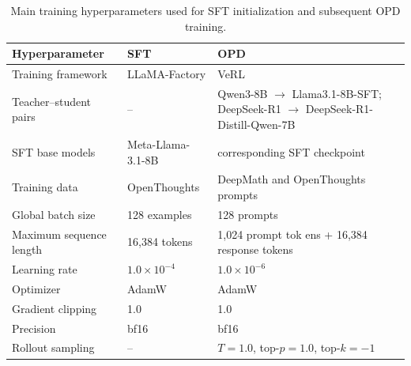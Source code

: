 \documentclass{article}
\theoremstyle{plain}
\theoremstyle{definition}
\theoremstyle{remark}
\begin{document}
        \begin{table}[htbp]
        \centering
        \caption{Main training hyperparameters used for SFT initialization and subsequent OPD training.}
        \small
        \setlength{\tabcolsep}{6pt}
        \renewcommand{\arraystretch}{1.15}
        \begin{tabular}{p{}|p{}|p{}}
        \toprule[1.3pt]
        \textbf{Hyperparameter} & \textbf{SFT} & \textbf{OPD} \\
        \midrule
        Training framework & LLaMA-Factory & VeRL \\
        \midrule
        Teacher--student pairs & -- & Qwen3-8B $\rightarrow$ Llama3.1-8B-SFT; DeepSeek-R1 $\rightarrow$ DeepSeek-R1-Distill-Qwen-7B \\
        \midrule
        SFT base models & Meta-Llama-3.1-8B & corresponding SFT checkpoint \\
        \midrule
        Training data & OpenThoughts & DeepMath and OpenThoughts prompts \\
        \midrule
        Global batch size & 128 examples & 128 prompts \\
        \midrule
        Maximum sequence length & 16,384 tokens & 1,024 prompt tok ens + 16,384 response tokens \\
        \midrule
        Learning rate & $1.0 \times 10^{-4}$ & $1.0 \times 10^{-6}$ \\
        \midrule
        Optimizer & AdamW & AdamW \\
        \midrule
        Gradient clipping & 1.0 & 1.0 \\
        \midrule
        Precision & bf16 & bf16 \\
        \midrule
        Rollout sampling & -- & $T=1.0$, top-$p=1.0$, top-$k=-1$ \\
        \bottomrule
        \end{tabular}
        \label{tab:hyperparams}
        \end{table}
\end{document}
